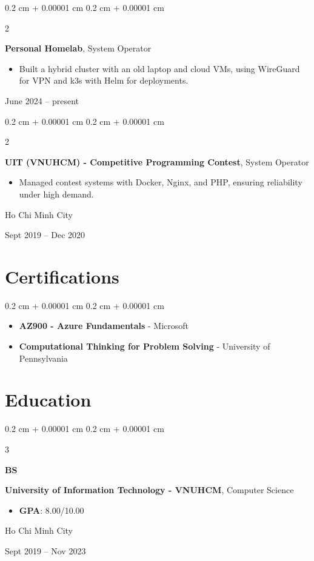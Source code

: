 \documentclass[10pt, a4paper]{article}
\newenvironment{highlights}{
    \begin{itemize}[
        topsep=0.12 cm,
        parsep=0.10 cm,
        partopsep=0pt,
        itemsep=0pt,
        leftmargin=0.4 cm + 10pt
    ]
}{
    \end{itemize}
} %
\newenvironment{highlightsforbulletentries}{
    \begin{itemize}[
        topsep=0.12 cm,
        parsep=0.10 cm,
        partopsep=0pt,
        itemsep=0pt,
        leftmargin=10pt
    ]
}{
    \end{itemize}
} %
\newenvironment{onecolentry}{
    \begin{adjustwidth}{
        0.2 cm + 0.00001 cm
    }{
        0.2 cm + 0.00001 cm
    }
}{
    \end{adjustwidth}
} %
\newenvironment{twocolentry}[2][]{
    \onecolentry
    \def\secondColumn{#2}
    \setcolumnwidth{\fill, 4.5 cm}
    \begin{paracol}{2}
}{
    \switchcolumn \raggedleft \secondColumn
    \end{paracol}
    \endonecolentry
} %
\newenvironment{threecolentry}[3][]{
    \onecolentry
    \def\thirdColumn{#3}
    \setcolumnwidth{1 cm, \fill, 4.5 cm}
    \begin{paracol}{3}
    {\raggedright #2} \switchcolumn
}{
    \switchcolumn \raggedleft \thirdColumn
    \end{paracol}
    \endonecolentry
} %
\begin{document}
        \begin{twocolentry}{
            June 2024 – present
        }
            \textbf{Personal Homelab}, System Operator
            \begin{highlights}
                \item Built a hybrid cluster with an old laptop and cloud VMs, using WireGuard for VPN and k3s with Helm for deployments.
            \end{highlights}
        \end{twocolentry}


        \vspace{0.2 cm}

        \begin{twocolentry}{
            Ho Chi Minh City

        Sept 2019 – Dec 2020
        }
            \textbf{UIT (VNUHCM) - Competitive Programming Contest}, System Operator
            \begin{highlights}
                \item Managed contest systems with Docker, Nginx, and PHP, ensuring reliability under high demand.
            \end{highlights}
        \end{twocolentry}



    
    \section{Certifications}

    \begin{onecolentry}
        \begin{highlightsforbulletentries}


        \item \textbf{AZ900 - Azure Fundamentals} - Microsoft

        \item \textbf{Computational Thinking for Problem Solving} - University of Pennsylvania


        \end{highlightsforbulletentries}
    \end{onecolentry}

    \section{Education}



        
        \begin{threecolentry}{\textbf{BS}}{
            Ho Chi Minh City

        Sept 2019 – Nov 2023
        }
            \textbf{University of Information Technology - VNUHCM}, Computer Science
            \begin{highlights}
                \item \textbf{GPA}: 8.00/10.00
            \end{highlights}
        \end{threecolentry}
\end{document}

